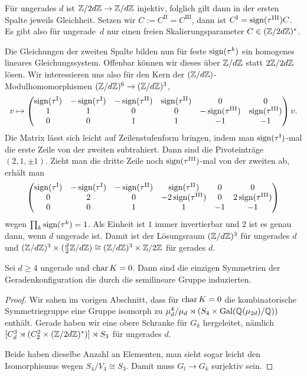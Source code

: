 Für ungerades $d$ ist $\Zmod 2dZ \to \Zmod dZ$ injektiv, folglich gilt dann in der ersten Spalte jeweils Gleichheit. Setzen wir $C := C^\mathrm{II} = C^\mathrm{III}$, dann ist $C^\mathrm{I} = \operatorname{sign}(\tau^\mathrm{III}) C$. Es gibt also für ungerade~$d$ nur einen freien Skalierungsparameter $C \in (\Zmod 2dZ)^*$.

Die Gleichungen der zweiten Spalte bilden nun für feste $\operatorname{sign}(\tau^k)$ ein homogenes lineares Gleichungssystem. Offenbar können wir dieses über $\Zmod dZ$ statt $2\Zmod 2dZ$ lösen. Wir interessieren uns also für den Kern der $(\Zmod dZ)$-Modulhomomorphismen $(\Zmod dZ)^6 \to (\Zmod dZ)^3$,
\begin{equation}
v \mapsto
\begin{pmatrix}
\operatorname{sign}(\tau^\mathrm{I}) & -\operatorname{sign}(\tau^\mathrm{I}) & -\operatorname{sign}(\tau^\mathrm{II}) & \operatorname{sign}(\tau^\mathrm{II}) & 0 & 0 \\
1 & 1 & 0 & 0 & -\operatorname{sign}(\tau^\mathrm{III}) & \operatorname{sign}(\tau^\mathrm{III}) \\
0 & 0 & 1 & 1 & -1 & -1
\end{pmatrix}v.
\end{equation}
Die Matrix lässt sich leicht auf Zeilenstufenform bringen, indem man $\operatorname{sign}(\tau^\mathrm{I})$-mal die erste Zeile von der zweiten subtrahiert. Dann sind die Pivoteinträge $(2,1,\pm 1)$. Zieht man die dritte Zeile noch $\operatorname{sign}(\tau^\mathrm{III})$-mal von der zweiten ab, erhält man
\begin{equation*}
\begin{pmatrix}
\operatorname{sign}(\tau^\mathrm{I}) & -\operatorname{sign}(\tau^\mathrm{I}) & -\operatorname{sign}(\tau^\mathrm{II}) & \operatorname{sign}(\tau^\mathrm{II}) & 0 & 0 \\
0 & 2 & 0 & -2\operatorname{sign}(\tau^\mathrm{III}) & 0 & 2\operatorname{sign}(\tau^\mathrm{III}) \\
0 & 0 & 1 & 1 & -1 & -1
\end{pmatrix}
\end{equation*}
wegen $\prod_k \operatorname{sign}(\tau^k) = 1$. Als Einheit ist $1$ immer invertierbar und $2$ ist es genau dann, wenn $d$ ungerade ist. Damit ist der Lösungsraum $(\Zmod dZ)^3$ für ungerades $d$ und $(\Zmod dZ)^3 \times (\frac d2\Zmod dZ) \cong (\Zmod dZ)^3 \times \Zmod 2Z$ für gerades $d$.

\begin{theorem}
Sei $d \geq 4$ ungerade und $\operatorname{char} K=0$. Dann sind die einzigen Symmetrien der Geradenkonfiguration die durch die semilineare Gruppe induzierten.
\end{theorem}
\begin{proof}
Wir sahen im vorigen Abschnitt, dass für $\operatorname{char} K=0$ die kombinatorische Symmetriegruppe eine Gruppe isomorph zu $\mu_d^4 / \mu_d \rtimes (S_4 \times \Gal \mathbb Q(\mu_{2d})/{\mathbb Q})$ enthält. Gerade haben wir eine obere Schranke für $G_k$ hergeleitet, nämlich $[C_d^3 \rtimes (C_2^2 \times (\Zmod 2dZ)^*)] \rtimes S_3$ für ungerades $d$.

Beide haben dieselbe Anzahl an Elementen, man sieht sogar leicht den Isomorphismus wegen $S_4/V_4 \cong S_3$. Damit muss $G_l \to G_k$ surjektiv sein.
\end{proof}


